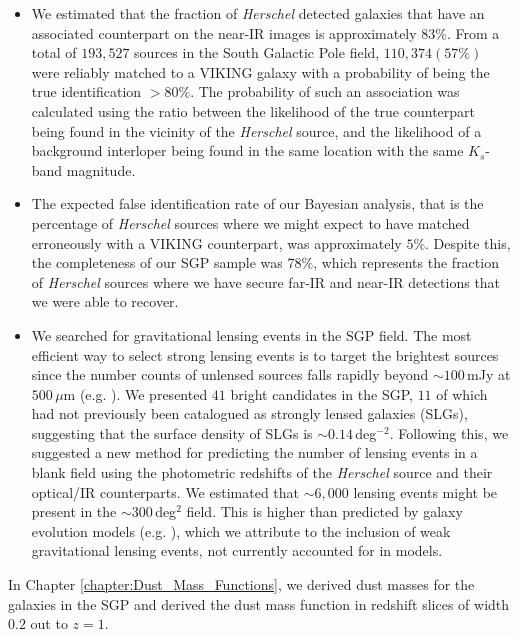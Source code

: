 \begin{itemize}
    \item We estimated that the fraction of \textit{Herschel} detected galaxies that have an associated counterpart on the near-IR images is approximately $83\%$. From a total of $193,527$ sources in the South Galactic Pole field, $110,374 (57\%)$ were reliably matched to a VIKING galaxy with a probability of being the true identification $> 80\%$. The probability of such an association was calculated using the ratio between the likelihood of the true counterpart being found in the vicinity of the \textit{Herschel} source, and the likelihood of a background interloper being found in the same location with the same $K_s$-band magnitude.
    \item The expected false identification rate of our Bayesian analysis, that is the percentage of \textit{Herschel} sources where we might expect to have matched erroneously with a VIKING counterpart, was approximately $5\%$. Despite this, the completeness of our SGP sample was $78\%$, which represents the fraction of \textit{Herschel} sources where we have secure far-IR and near-IR detections that we were able to recover.
    \item We searched for gravitational lensing events in the SGP field. The most efficient way to select strong lensing events is to target the brightest sources since the number counts of unlensed sources falls rapidly beyond $\sim100\,$mJy at $500\,\mu$m (e.g. \citealt{Vieira_2010, Wardlow_2013, Nayyeri_2016, Negrello_2017}). We presented $41$ bright candidates in the SGP, $11$ of which had not previously been catalogued as strongly lensed galaxies (SLGs), suggesting that the surface density of SLGs is $\sim0.14\,$deg$^{-2}$. Following this, we suggested a new method for predicting the number of lensing events in a blank field using the photometric redshifts of the \textit{Herschel} source and their optical/IR counterparts. We estimated that $\sim6,000$ lensing events might be present in the $\sim300\,$deg$^{2}$ field. This is higher than predicted by galaxy evolution models (e.g. \citealt{Negrello_2007, Cai_2013}), which we attribute to the inclusion of weak gravitational lensing events, not currently accounted for in models.
\end{itemize}

In Chapter \ref{chapter:Dust_Mass_Functions}, we derived dust masses for the galaxies in the SGP and derived the dust mass function in redshift slices of width $0.2$ out to $z = 1$.

